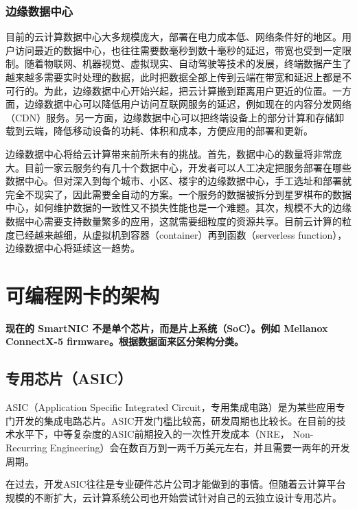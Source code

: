\subsubsection{边缘数据中心}

目前的云计算数据中心大多规模庞大，部署在电力成本低、网络条件好的地区。用户访问最近的数据中心，也往往需要数毫秒到数十毫秒的延迟，带宽也受到一定限制。随着物联网、机器视觉、虚拟现实、自动驾驶等技术的发展，终端数据产生了越来越多需要实时处理的数据，此时把数据全部上传到云端在带宽和延迟上都是不可行的。为此，边缘数据中心开始兴起，把云计算搬到距离用户更近的位置。一方面，边缘数据中心可以降低用户访问互联网服务的延迟，例如现在的内容分发网络（CDN）服务。另一方面，边缘数据中心可以把终端设备上的部分计算和存储卸载到云端，降低移动设备的功耗、体积和成本，方便应用的部署和更新。

边缘数据中心将给云计算带来前所未有的挑战。首先，数据中心的数量将非常庞大。目前一家云服务约有几十个数据中心，开发者可以人工决定把服务部署在哪些数据中心。但对深入到每个城市、小区、楼宇的边缘数据中心，手工选址和部署就完全不现实了，因此需要全自动的方案。一个服务的数据被拆分到星罗棋布的数据中心，如何维护数据的一致性又不损失性能也是一个难题。其次，规模不大的边缘数据中心需要支持数量繁多的应用，这就需要细粒度的资源共享。目前云计算的粒度已经越来越细，从虚拟机到容器（container）再到函数（serverless function），边缘数据中心将延续这一趋势。


\section{可编程网卡的架构}
\label{smartnic-architecture}

\textbf{现在的 SmartNIC 不是单个芯片，而是片上系统（SoC）。例如 Mellanox ConnectX-5 firmware。根据数据面来区分架构分类。}

\subsection{专用芯片（ASIC）}
\label{smartnic-asic}


ASIC（Application Specific Integrated Circuit，专用集成电路）是为某些应用专门开发的集成电路芯片。ASIC开发门槛比较高，研发周期也比较长。在目前的技术水平下，中等复杂度的ASIC前期投入的一次性开发成本（NRE， Non-Recurring Engineering）会在数百万到一两千万美元左右，并且需要一两年的开发周期。


在过去，开发ASIC往往是专业硬件芯片公司才能做到的事情。但随着云计算平台规模的不断扩大，云计算系统公司也开始尝试针对自己的云独立设计专用芯片。

